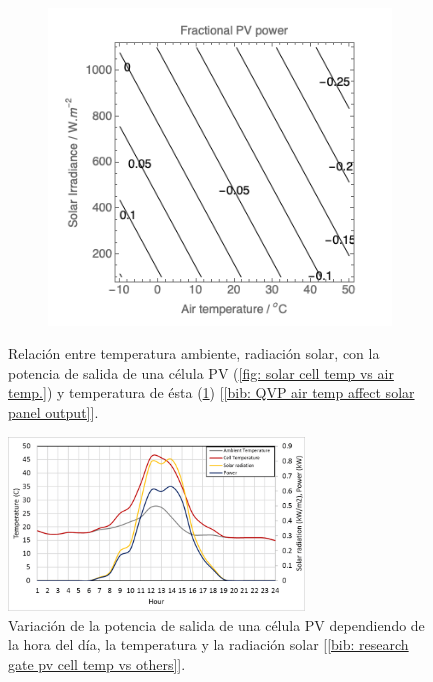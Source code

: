 \documentclass[12pt]{article}
\begin{document}
\begin{figure}[h]
\begin{subfigure}{0.55\textwidth}
			\includegraphics[width=1\linewidth]{img/powerPVCell_airTemp.png}
			\caption{}
			\label{fig:power output of a solar cell vs air temp.}
		\end{subfigure}
		\caption{Relación entre temperatura ambiente, radiación solar, con la potencia de salida de una célula PV (\ref{fig: solar cell temp vs air temp.}) y temperatura de ésta (\ref{fig:power output of a solar cell vs air temp.}) [\ref{bib: QVP air temp affect solar panel output}].}
		\label{fig:solar temp}
	\end{figure}
	
	\pagebreak
	
	
	\begin{figure}[h]
		\begin{center}
			\includegraphics[width=0.7\textwidth]{img/cellTemp_ambTemp_Irrad_Pow.png}
			\caption{Variación de la potencia de salida de una célula PV dependiendo de la hora del día, la temperatura y la radiación solar [\ref{bib: research gate pv cell temp vs others}].}
			\label{fig:cellTemp_ambTemp_Irrad_Pow}
		\end{center}
	\end{figure}
	
\end{document}
